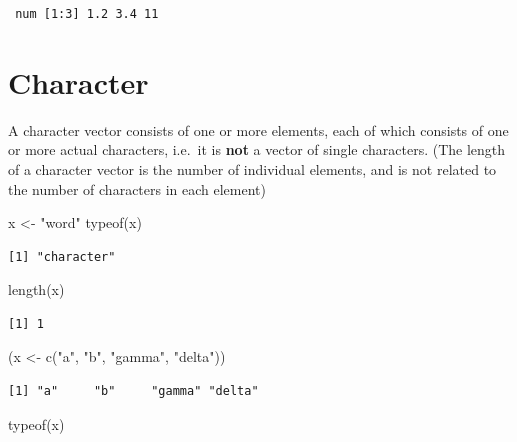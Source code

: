 \documentclass[
]{book}
\newenvironment{Shaded}{\begin{snugshade}}{\end{snugshade}}
\newcommand{\FunctionTok}[1]{\textcolor[rgb]{0.00,0.00,0.00}{#1}}
\newcommand{\NormalTok}[1]{#1}
\newcommand{\OtherTok}[1]{\textcolor[rgb]{0.56,0.35,0.01}{#1}}
\newcommand{\StringTok}[1]{\textcolor[rgb]{0.31,0.60,0.02}{#1}}
\begin{document}
\begin{verbatim}
 num [1:3] 1.2 3.4 11
\end{verbatim}

\hypertarget{character}{%
\section{Character}\label{character}}

A character vector consists of one or more elements, each of which consists of one or more actual characters, i.e.~it is \textbf{not} a vector of single characters. (The length of a character vector is the number of individual elements, and is not related to the number of characters in each element)

\begin{Shaded}
\begin{Highlighting}[]
\NormalTok{x }\OtherTok{\textless{}{-}} \StringTok{"word"}
\FunctionTok{typeof}\NormalTok{(x)}
\end{Highlighting}
\end{Shaded}

\begin{verbatim}
[1] "character"
\end{verbatim}

\begin{Shaded}
\begin{Highlighting}[]
\FunctionTok{length}\NormalTok{(x)}
\end{Highlighting}
\end{Shaded}

\begin{verbatim}
[1] 1
\end{verbatim}

\begin{Shaded}
\begin{Highlighting}[]
\NormalTok{(x }\OtherTok{\textless{}{-}} \FunctionTok{c}\NormalTok{(}\StringTok{"a"}\NormalTok{, }\StringTok{"b"}\NormalTok{, }\StringTok{"gamma"}\NormalTok{, }\StringTok{"delta"}\NormalTok{))}
\end{Highlighting}
\end{Shaded}

\begin{verbatim}
[1] "a"     "b"     "gamma" "delta"
\end{verbatim}

\begin{Shaded}
\begin{Highlighting}[]
\FunctionTok{typeof}\NormalTok{(x)}
\end{Highlighting}
\end{Shaded}
\end{document}
